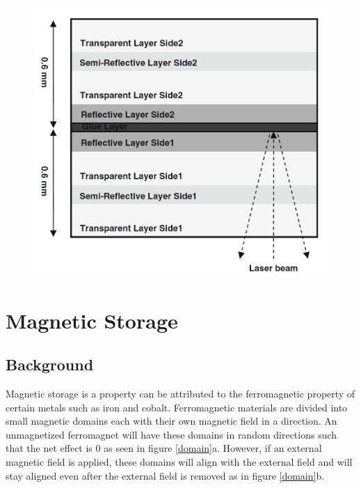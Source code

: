 \documentclass[ aip, 12pt]{revtex4-1} %
\begin{document}
\begin{figure}[H]
\centerline{\includegraphics[scale=.45]{DVD.png}}
\caption{ }
\label{DVD}
\end{figure} 


\section{Magnetic Storage}
\subsection{Background}
Magnetic storage is a property can be attributed to the ferromagnetic property of certain metals such as iron and cobalt. Ferromagnetic materials are divided into small magnetic domains each with their own magnetic field in a direction. An unmagnetized ferromagnet will have these domains in random directions such that the net effect is 0 as seen in figure \ref{domain}a. However, if an external magnetic field is applied, these domains will align with the external field and will stay aligned even after the external field is removed as in figure \ref{domain}b. 
\end{document}
